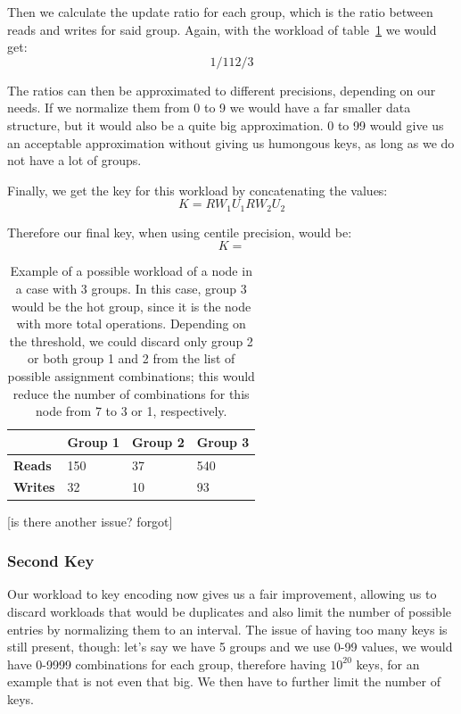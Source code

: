 Then we calculate the update ratio for each group, which is the ratio between reads and writes for said group. Again, with the workload of table~\ref{tab:workload-example} we would get:
$$1/11 2/3 $$

The ratios can then be approximated to different precisions, depending on our needs. If we normalize them from 0 to 9 we would have a far smaller data structure, but it would also be a quite big approximation. 0 to 99 would give us an acceptable approximation without giving us humongous keys, as long as we do not have a lot of groups. 

Finally, we get the key for this workload by concatenating the values:
$$ K = RW_1 U_1 RW_2 U_2 $$

Therefore our final key, when using centile precision, would be:
$$ K = $$

\begin{table}[!htb]
  \centering
  \begin{tabular}{l l l l}
    \hline
    & \textbf{Group 1} & \textbf{Group 2} & \textbf{Group 3} \\
    \hline
    \textbf{Reads} & 150 & 37 & 540 \\
    \textbf{Writes} & 32 & 10 & 93 \\
    \hline
  \end{tabular}
  \caption{Example of a possible workload of a node in a case with 3 groups. In this case, group 3 would be the hot group, since it is the node with more total operations. Depending on the threshold, we could discard only group 2 or both group 1 and 2 from the list of possible assignment combinations; this would reduce the number of combinations for this node from 7 to 3 or 1, respectively.}\label{tab:workload-example}
\end{table}


[is there another issue? forgot]

\subsubsection{Second Key}\label{sec:second-key}

Our workload to key encoding now gives us a fair improvement, allowing us to discard workloads that would be duplicates and also limit the number of possible entries by normalizing them to an interval. The issue of having too many keys is still present, though: let's say we have 5 groups and we use 0-99 values, we would have 0-9999 combinations for each group, therefore having $10^{20}$ keys, for an example that is not even that big. We then have to further limit the number of keys. 

